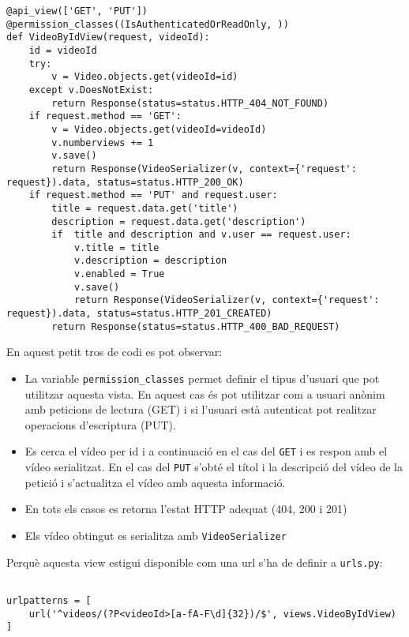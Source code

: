 \documentclass[12pt, titlepage]{article}
\begin{document}
\begin{lstlisting}[breaklines]
@api_view(['GET', 'PUT'])
@permission_classes((IsAuthenticatedOrReadOnly, ))
def VideoByIdView(request, videoId):
    id = videoId
    try:
        v = Video.objects.get(videoId=id)
    except v.DoesNotExist:
        return Response(status=status.HTTP_404_NOT_FOUND)
    if request.method == 'GET':
        v = Video.objects.get(videoId=videoId)
        v.numberviews += 1
        v.save()
        return Response(VideoSerializer(v, context={'request': request}).data, status=status.HTTP_200_OK)
    if request.method == 'PUT' and request.user:
        title = request.data.get('title')
        description = request.data.get('description')
        if  title and description and v.user == request.user:
            v.title = title
            v.description = description
            v.enabled = True
            v.save()
            return Response(VideoSerializer(v, context={'request': request}).data, status=status.HTTP_201_CREATED)
        return Response(status=status.HTTP_400_BAD_REQUEST)
\end{lstlisting}

En aquest petit tros de codi es pot observar:

\begin{itemize}

\item La variable \verb|permission_classes| permet definir el tipus d'usuari que pot
utilitzar aquesta vista. En aquest cas és pot utilitzar com a usuari anònim amb
peticions de lectura (GET) i si l'usuari està autenticat pot realitzar operacions
d'escriptura (PUT).

\item Es cerca el vídeo per id i a continuació en el cas del \verb|GET| i es respon
amb el vídeo serialitzat. En el cas del \verb|PUT| s'obté el títol i la descripció
del vídeo de la petició i s'actualitza el vídeo amb aquesta informació.

\item En tots els casos es retorna l'estat HTTP adequat (404, 200 i 201)

\item Els vídeo obtingut es serialitza amb \verb|VideoSerializer|

\end{itemize}

Perquè aquesta view estigui disponible com una url s'ha de definir a \verb|urls.py|:

\begin{lstlisting}[breaklines]

urlpatterns = [
    url('^videos/(?P<videoId>[a-fA-F\d]{32})/$', views.VideoByIdView)
]
\end{lstlisting}
\end{document}
